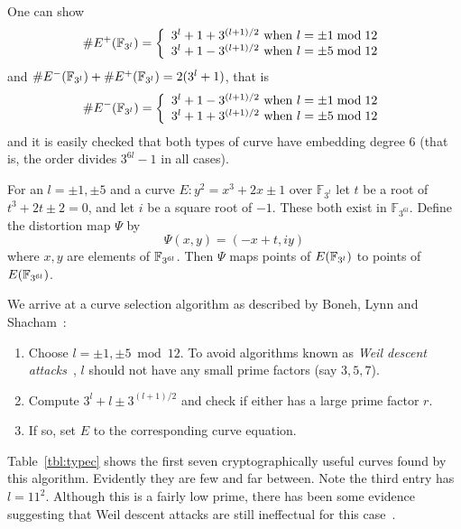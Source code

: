 One can show
\[
\#E^+(\mathbb{F}_{3^l}) = \left \{ \begin{array}{rcl}
3^l + 1 + 3^{(l+1)/2} \mbox { when } l = \pm 1 \bmod 12 \\
3^l + 1 - 3^{(l+1)/2} \mbox { when } l = \pm 5 \bmod 12
\end{array} \right.
\]
and $\#E^-(\mathbb{F}_{3^l}) + \#E^+(\mathbb{F}_{3^l}) = 2(3^l + 1)$, that is
\[
\#E^-(\mathbb{F}_{3^l}) = \left \{ \begin{array}{rcl}
3^l + 1 - 3^{(l+1)/2} \mbox { when } l = \pm 1 \bmod 12 \\
3^l + 1 + 3^{(l+1)/2} \mbox { when } l = \pm 5 \bmod 12
\end{array} \right.
\]
and it is easily checked that both types of curve have embedding
degree 6 (that is, the order divides $3^{6l} -1$ in all cases).

For an $l = \pm 1, \pm 5$ and a
curve $E : y^2 = x^3 + 2 x \pm 1$ over $\mathbb{F}_{3^l}$
let $t$ be a root of $t^3 + 2t \pm 2 = 0$, and let $i$ be a
square root of $-1$. These both exist in $\mathbb{F}_{3^{6l}}$.
Define the distortion map $\Psi$ by
\[ \Psi(x,y) = (-x + t, i y) \]
where $x, y$ are elements of $\mathbb{F}_{3^{6l}}$. Then $\Psi$ maps points
of $E(\mathbb{F}_{3^l})$ to points of $E(\mathbb{F}_{3^{6l}})$.

We arrive at a curve selection algorithm as described by
Boneh, Lynn and Shacham~\cite{bls}:

\begin{enumerate}
\item
Choose $l = \pm 1, \pm 5 \bmod 12$. To avoid algorithms known as
\emph{Weil descent attacks}~\cite{weildescent1, weildescent2},
$l$ should not have any small prime factors (say $3,5,7$).
\item
Compute $3^l + l \pm 3^{(l+1)/2}$ and check if either has a large prime
factor $r$.
\item
If so, set $E$ to the corresponding curve equation.
\end{enumerate}

Table~\ref{tbl:typec} shows the first seven cryptographically useful curves
found by this algorithm. Evidently they are few and far between.
Note the third entry has $l = 11^2$. Although this is a fairly low
prime, there has been some evidence suggesting that Weil descent attacks
are still ineffectual for this case~\cite{ghsonodd}.


